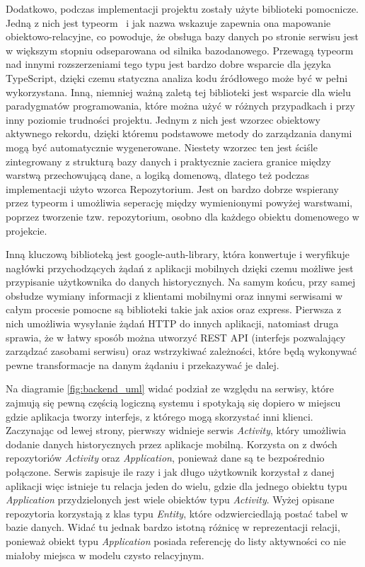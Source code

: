 \documentclass[a4paper,twoside,12pt]{book}
\begin{document}
Dodatkowo, podczas implementacji projektu zostały użyte biblioteki pomocnicze. Jedną z nich jest typeorm~\cite{typeorm} i jak nazwa wskazuje zapewnia ona mapowanie obiektowo-relacyjne, co powoduje, że obsługa bazy danych po stronie serwisu jest w większym stopniu odseparowana od silnika bazodanowego. Przewagą typeorm nad innymi rozszerzeniami tego typu jest bardzo dobre wsparcie dla języka TypeScript, dzięki czemu statyczna analiza kodu źródłowego może być w pełni wykorzystana. Inną, niemniej ważną zaletą tej biblioteki jest wsparcie dla wielu paradygmatów programowania, które można użyć w różnych przypadkach i przy inny poziomie trudności projektu. Jednym z nich jest wzorzec obiektowy aktywnego rekordu, dzięki któremu podstawowe metody do zarządzania danymi mogą być automatycznie wygenerowane. Niestety wzorzec ten jest ściśle zintegrowany z strukturą bazy danych i praktycznie zaciera granice między warstwą przechowującą dane, a logiką domenową, dlatego też podczas implementacji użyto wzorca Repozytorium. Jest on bardzo dobrze wspierany przez typeorm i umożliwia seperację między wymienionymi powyżej warstwami, poprzez tworzenie tzw. repozytorium, osobno dla każdego obiektu domenowego w projekcie.

Inną kluczową biblioteką jest google-auth-library, która konwertuje i weryfikuje nagłówki przychodzących żądań z aplikacji mobilnych dzięki czemu możliwe jest przypisanie użytkownika do danych historycznych. Na samym końcu, przy samej obsłudze wymiany informacji z klientami mobilnymi oraz innymi serwisami w całym procesie pomocne są biblioteki takie jak axios oraz express. Pierwsza z nich umożliwia wysyłanie żądań HTTP do innych aplikacji, natomiast druga sprawia, że w łatwy sposób można utworzyć REST API (interfejs pozwalający zarządzać zasobami serwisu) oraz wstrzykiwać zależności, które będą wykonywać pewne transformacje na danym żądaniu i przekazywać je dalej. 

Na diagramie \ref{fig:backend_uml} widać podział ze względu na serwisy, które zajmują się pewną częścią logiczną systemu i spotykają się dopiero w miejscu gdzie aplikacja tworzy interfejs, z którego mogą skorzystać inni klienci. Zaczynając od lewej strony, pierwszy widnieje serwis \textit{Activity}, który umożliwia dodanie danych historycznych przez aplikacje mobilną. Korzysta on z dwóch repozytoriów \textit{Activity} oraz \textit{Application}, ponieważ dane są te bezpośrednio połączone. Serwis zapisuje ile razy i jak długo użytkownik korzystał z danej aplikacji więc istnieje tu relacja jeden do wielu, gdzie dla jednego obiektu typu \textit{Application} przydzielonych jest wiele obiektów typu \textit{Activity}. Wyżej opisane repozytoria korzystają z klas typu \textit{Entity}, które odzwierciedlają postać tabel w bazie danych. Widać tu jednak bardzo istotną różnicę w reprezentacji relacji, ponieważ obiekt typu \textit{Application} posiada referencję do listy aktywności co nie miałoby miejsca w modelu czysto relacyjnym. 
\end{document}
